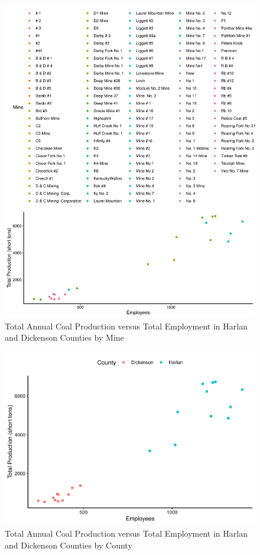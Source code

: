 \documentclass[12pt,]{article}
\begin{document}
\begin{figure}
\centering
\includegraphics{Smith_ENV872_Project_files/figure-latex/unnamed-chunk-12-1.pdf}
\caption{\label{fig:figs} Total Annual Coal Production versus Total
Employment in Harlan and Dickenson Counties by Mine}
\end{figure}

\begin{figure}
\centering
\includegraphics{Smith_ENV872_Project_files/figure-latex/unnamed-chunk-13-1.pdf}
\caption{\label{fig:figs} Total Annual Coal Production versus Total
Employment in Harlan and Dickenson Counties by County}
\end{figure}
\end{document}
